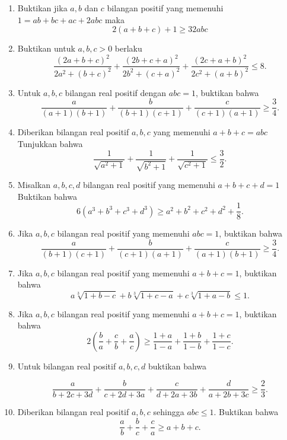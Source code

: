 \documentclass[12pt]{scrartcl}
\begin{document}
\begin{enumerate}
\item Buktikan jika $a, b$ dan $c$ bilangan positif yang memenuhi $1 = ab+bc+ac+2abc$ maka
$$2(a+b+c)+1\ge32abc$$

\item Buktikan untuk \(a, b,c>0\) berlaku \\
\[\frac{(2a+b+c)^{2}}{2a^{2}+(b+c)^{2}}+\frac{(2b+c+a)^{2}}{2b^{2}+(c+a)^{2}}+\frac{(2c+a+b)^{2}}{2c^{2}+(a+b)^{2}}\le8.\]

\item Untuk $a, b, c$ bilangan real positif dengan $abc = 1$, buktikan bahwa \\
\[\frac{a}{(a+1)(b+1)}+\frac{b}{(b+1)(c+1)}+\frac{c}{(c+1)(a+1)}\ge\frac{3}{4}.\]

\item Diberikan bilangan real positif $a, b, c$ yang memenuhi $a+b+c=abc$ 
Tunjukkan bahwa
\[\frac{1}{\sqrt{a^{2}+1}}+\frac{1}{\sqrt{b^{2}+1}}+\frac{1}{\sqrt{c^{2}+1}}\le\frac{3}{2}.\]

\item Misalkan $a, b, c, d$ bilangan real positif yang memenuhi $a+b+c+d=1$ 
Buktikan bahwa
\[6(a^{3}+b^{3}+c^{3}+d^{3})\ge a^{2}+b^{2}+c^{2}+d^{2}+\frac{1}{8}.\]

\item Jika $a, b, c$ bilangan real positif yang memenuhi $abc = 1$, buktikan bahwa
\[\frac{a}{(b+1)(c+1)}+\frac{b}{(c+1)(a+1)}+\frac{c}{(a+1)(b+1)}\ge\frac{3}{4}.\]

\item Jika $a, b, c$ bilangan real positif yang memenuhi $a+b+c=1$, buktikan bahwa
\[a\sqrt[3]{1+b-c}+b\sqrt[3]{1+c-a}+c\sqrt[3]{1+a-b}\le1.\]

\item Jika $a, b, c$ bilangan real positif yang memenuhi $a+b+c=1$, buktikan bahwa
\[2\left(\frac{b}{a}+\frac{c}{b}+\frac{a}{c}\right)\ge\frac{1+a}{1-a}+\frac{1+b}{1-b}+\frac{1+c}{1-c}.\]

\item Untuk bilangan real positif $a, b, c, d$ buktikan bahwa

\[\frac{a}{b+2c+3d}+\frac{b}{c+2d+3a}+\frac{c}{d+2a+3b}+\frac{d}{a+2b+3c}\ge\frac{2}{3}.\]

\item Diberikan bilangan real positif $a, b, c$ sehingga $abc \le 1$. Buktikan bahwa
\[\frac{a}{b}+\frac{b}{c}+\frac{c}{a}\ge a+b+c.\]
\end{enumerate}
\end{document}
